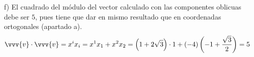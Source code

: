 \noindent
f) El cuadrado del módulo del vector calculado con las componentes oblicuas debe ser
$5$, pues tiene que dar en mismo resultado que en coordenadas ortogonales (apartado a).
\begin{align*}
  \vvv{v}\cdot\vvv{v}
  &=
    x^ix_i
    = x^1 x_1 + x^2 x_2
    = \left(1+2\sqrt{3}\right)\cdot 1
    + (-4)\left(-1 + \dfrac{\sqrt{3}}{2}\right)
    = 5
\end{align*}



